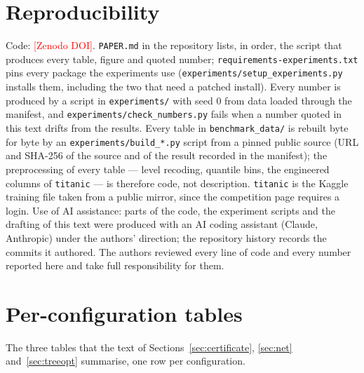 \documentclass[11pt]{article}
\newcommand{\todo}[1]{\textcolor{red}{[#1]}}
\begin{document}
\section{Reproducibility}
Code: \todo{Zenodo DOI}. \texttt{PAPER.md} in the repository lists, in order, the script that produces every table, figure and quoted number; \texttt{requirements-experiments.txt} pins every package the experiments use (\texttt{experiments/setup\_experiments.py} installs them, including the two that need a patched install). Every number is produced by a script in \texttt{experiments/} with seed 0 from data loaded through the manifest, and \texttt{experiments/check\_numbers.py} fails when a number quoted in this text drifts from the results. Every table in \texttt{benchmark\_data/} is rebuilt byte for byte by an \texttt{experiments/build\_*.py} script from a pinned public source (URL and SHA-256 of the source and of the result recorded in the manifest); the preprocessing of every table --- level recoding, quantile bins, the engineered columns of \texttt{titanic} --- is therefore code, not description. \texttt{titanic} is the Kaggle training file taken from a public mirror, since the competition page requires a login. Use of AI assistance: parts of the code, the experiment scripts and the drafting of this text were produced with an AI coding assistant (Claude, Anthropic) under the authors' direction; the repository history records the commits it authored. The authors reviewed every line of code and every number reported here and take full responsibility for them.


\appendix
\section{Per-configuration tables}\label{app:tables}
The three tables that the text of Sections~\ref{sec:certificate}, \ref{sec:net} and~\ref{sec:treeopt} summarise, one row per configuration.

\begin{table}[p]\centering\footnotesize\setlength{\tabcolsep}{3.5pt}
\caption{Family certificate against the exploratory/holdout split on the same folds: held-out coverage (points) at $B=32$ and, for partial centres, the share of splits ($\ge\tau$) whose held-out union purity reaches $\tau$. ``--'': no method reaches $1\,\%$ held-out coverage under that rule, so the configuration is uninformative and left out of the paired comparison. The four configurations that are uninformative under both rules (\texttt{car}, \texttt{resume}, \texttt{breast\_cancer}, \texttt{splice}) have no row. A dataset run for two targets or two size floors carries the target or $m$ in brackets, here and in every table below. Generated by \texttt{experiments/paper\_tables.py}.}\label{tab:split}

\end{table}
\end{document}
